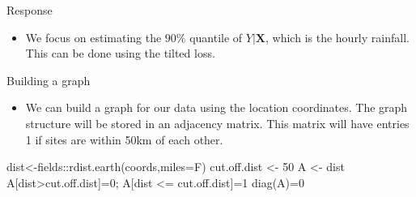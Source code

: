 \documentclass[
  ignorenonframetext,
]{beamer}
\newenvironment{Shaded}{\begin{snugshade}}{\end{snugshade}}
\newcommand{\AttributeTok}[1]{\textcolor[rgb]{0.77,0.63,0.00}{#1}}
\newcommand{\ControlFlowTok}[1]{\textcolor[rgb]{0.13,0.29,0.53}{\textbf{#1}}}
\newcommand{\DecValTok}[1]{\textcolor[rgb]{0.00,0.00,0.81}{#1}}
\newcommand{\FloatTok}[1]{\textcolor[rgb]{0.00,0.00,0.81}{#1}}
\newcommand{\FunctionTok}[1]{\textcolor[rgb]{0.00,0.00,0.00}{#1}}
\newcommand{\NormalTok}[1]{#1}
\newcommand{\OtherTok}[1]{\textcolor[rgb]{0.56,0.35,0.01}{#1}}
\newcommand{\SpecialCharTok}[1]{\textcolor[rgb]{0.00,0.00,0.00}{#1}}
\providecommand{\tightlist}{%
  \setlength{\itemsep}{0pt}\setlength{\parskip}{0pt}}
\begin{document}
\begin{frame}[fragile]{Response}
\protect\hypertarget{response}{}
\begin{itemize}
\tightlist
\item
  We focus on estimating the \(90\%\) quantile of \(Y|\mathbf{X}\),
  which is the hourly rainfall. This can be done using the tilted loss.
\end{itemize}

\begin{Shaded}
\end{Shaded}
\end{frame}

\begin{frame}[fragile]{Building a graph}
\protect\hypertarget{building-a-graph}{}
\begin{itemize}
\tightlist
\item
  We can build a graph for our data using the location coordinates. The
  graph structure will be stored in an adjacency matrix. This matrix
  will have entries 1 if sites are within 50km of each other.
\end{itemize}

\begin{Shaded}
\begin{Highlighting}[]
\NormalTok{dist}\OtherTok{\textless{}{-}}\NormalTok{fields}\SpecialCharTok{::}\FunctionTok{rdist.earth}\NormalTok{(coords,}\AttributeTok{miles=}\NormalTok{F)}
\NormalTok{cut.off.dist }\OtherTok{\textless{}{-}} \DecValTok{50}
\NormalTok{A }\OtherTok{\textless{}{-}}\NormalTok{ dist}
\NormalTok{A[dist}\SpecialCharTok{\textgreater{}}\NormalTok{cut.off.dist]}\OtherTok{=}\DecValTok{0}\NormalTok{; A[dist }\SpecialCharTok{\textless{}=}\NormalTok{ cut.off.dist]}\OtherTok{=}\DecValTok{1}
\FunctionTok{diag}\NormalTok{(A)}\OtherTok{=}\DecValTok{0}
\end{Highlighting}
\end{Shaded}
\end{frame}
\end{document}
